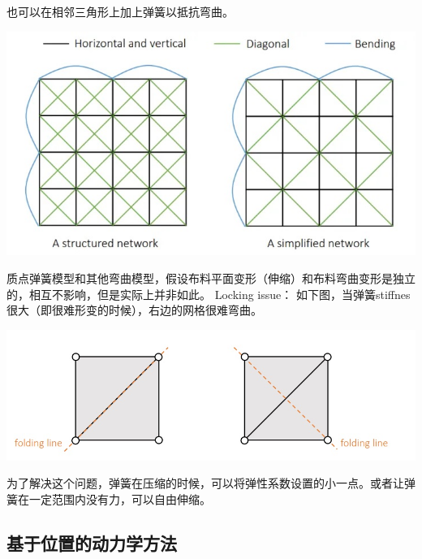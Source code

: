 \documentclass{CLGPY}
\begin{document}
\begin{multicols}{2}
		也可以在相邻三角形上加上弹簧以抵抗弯曲。

        \begin{center}
            \includegraphics[width=1.0\linewidth]{./fig/三种弹簧.jpg}
        \end{center}

		质点弹簧模型和其他弯曲模型，假设布料平面变形（伸缩）和布料弯曲变形是独立的，相互不影响，但是实际上并非如此。 Locking issue： 如下图，当弹簧stiffnes很大（即很难形变的时候），右边的网格很难弯曲。
        \begin{center}
            \includegraphics[width=1.0\linewidth]{./fig/Locking issue.jpg}
        \end{center}

		为了解决这个问题，弹簧在压缩的时候，可以将弹性系数设置的小一点。或者让弹簧在一定范围内没有力，可以自由伸缩。

		\subsection{基于位置的动力学方法}


\end{multicols}
\end{document}
